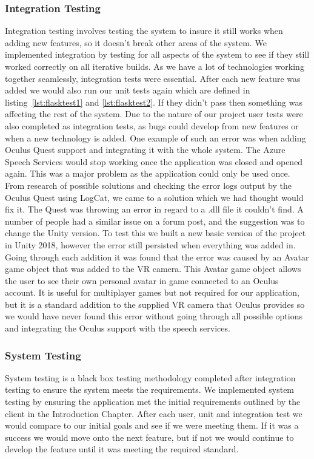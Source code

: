 \subsubsection{Integration Testing}
Integration testing involves testing the system to insure it still works when adding new features, so it doesn't break other areas of the system. We implemented integration by testing for all aspects of the system to see if they still worked correctly on all iterative builds. As we have a lot of technologies working together seamlessly, integration tests were essential. After each new feature was added we would also run our unit tests again which are defined in listing~\ref{lst:flasktest1} and \ref{lst:flasktest2}. If they didn't pass then something was affecting the rest of the system. Due to the nature of our project user tests were also completed as integration tests, as bugs could develop from new features or when a new technology is added. One example of such an error was when adding Oculus Quest support and integrating it with the whole system. The Azure Speech Services would stop working once the application was closed and opened again. This was a major problem as the application could only be used once. From research of possible solutions and checking the error logs output by the Oculus Quest using LogCat, we came to a solution which we had thought would fix it. The Quest was throwing an error in regard to a .dll file it couldn't find. A number of people had a similar issue on a forum post, and the suggestion was to change the Unity version. To test this we built a new basic version of the project in Unity 2018, however the error still persisted when everything was added in. Going through each addition it was found that the error was caused by an Avatar game object that was added to the VR camera. This Avatar game object allows the user to see their own personal avatar in game connected to an Oculus account. It is useful for multiplayer games but not required for our application, but it is a standard addition to the supplied VR camera that Oculus provides so we would have never found this error without going through all possible options and integrating the Oculus support with the speech services.

\subsubsection{System Testing}
System testing is a black box testing methodology completed after integration testing to ensure the system meets the requirements. We implemented system testing by ensuring the application met the initial requirements outlined by the client in the Introduction Chapter. After each user, unit and integration test we would compare to our initial goals and see if we were meeting them. If it was a success we would move onto the next feature, but if not we would continue to develop the feature until it was meeting the required standard.

